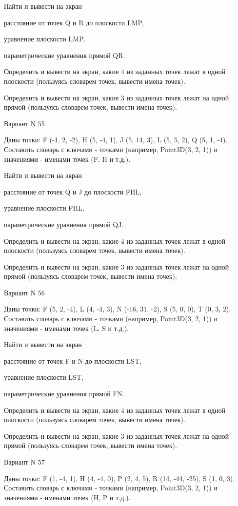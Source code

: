 \documentclass[11pt]{report}
\begin{document}
 
Найти и вывести на экран


расстояние от точек Q и R до плоскости LMP,

 
уравнение плоскости LMP,

 
параметрические уравнения прямой QR.


Определить и вывести на экран, какие 4 из заданных точек лежат в одной плоскости (пользуясь словарем точек, вывести имена точек).


Определить и вывести на экран, какие 3 из заданных точек лежат на одной прямой (пользуясь словарем точек, вывести имена точек).

Вариант N 55

Даны точки: F (-1, 2, -2), H (5, -4, 1), J (5, 14, 3), L (5, 5, 2), Q (5, 1, -4).
Составить словарь с ключами - точками (например, Point3D(3, 2, 1)) и значениями - именами точек (F, H и т.д.).

 
Найти и вывести на экран


расстояние от точек Q и J до плоскости FHL,

 
уравнение плоскости FHL,

 
параметрические уравнения прямой QJ.


Определить и вывести на экран, какие 4 из заданных точек лежат в одной плоскости (пользуясь словарем точек, вывести имена точек).


Определить и вывести на экран, какие 3 из заданных точек лежат на одной прямой (пользуясь словарем точек, вывести имена точек).

Вариант N 56

Даны точки: F (5, 2, -4), L (4, -4, 3), N (-16, 31, -2), S (5, 0, 0), T (0, 3, 2).
Составить словарь с ключами - точками (например, Point3D(3, 2, 1)) и значениями - именами точек (L, S и т.д.).

 
Найти и вывести на экран


расстояние от точек F и N до плоскости LST,

 
уравнение плоскости LST,

 
параметрические уравнения прямой FN.


Определить и вывести на экран, какие 4 из заданных точек лежат в одной плоскости (пользуясь словарем точек, вывести имена точек).


Определить и вывести на экран, какие 3 из заданных точек лежат на одной прямой (пользуясь словарем точек, вывести имена точек).

Вариант N 57

Даны точки: F (1, -4, 1), H (4, -4, 0), P (2, 4, 5), R (14, -44, -25), S (1, 0, 3).
Составить словарь с ключами - точками (например, Point3D(3, 2, 1)) и значениями - именами точек (H, P и т.д.).
\end{document}
